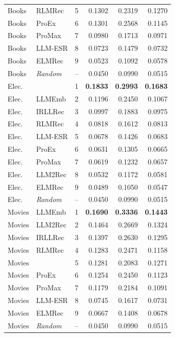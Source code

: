 \begin{table}[t]
\begin{minipage}[t]{0.49\textwidth}
\begin{tabular}{llrrrr}
Books & RLMRec & 5 & 0.1302 & 0.2319 & 0.1270 \\
Books & ProEx & 6 & 0.1301 & 0.2568 & 0.1145 \\
Books & ProMax & 7 & 0.0980 & 0.1713 & 0.0971 \\
Books & LLM-ESR & 8 & 0.0723 & 0.1479 & 0.0732 \\
Books & ELMRec & 9 & 0.0523 & 0.1092 & 0.0578 \\
Books & \textit{Random} & -- & 0.0450 & 0.0990 & 0.0515 \\
\midrule
Elec. & \method{} & 1 & \textbf{0.1833} & \textbf{0.2993} & \textbf{0.1683} \\
Elec. & LLMEmb & 2 & 0.1196 & 0.2450 & 0.1067 \\
Elec. & IRLLRec & 3 & 0.0997 & 0.1883 & 0.0975 \\
Elec. & RLMRec & 4 & 0.0818 & 0.1612 & 0.0813 \\
Elec. & LLM-ESR & 5 & 0.0678 & 0.1426 & 0.0683 \\
Elec. & ProEx & 6 & 0.0631 & 0.1305 & 0.0665 \\
Elec. & ProMax & 7 & 0.0619 & 0.1232 & 0.0657 \\
Elec. & LLM2Rec & 8 & 0.0532 & 0.1172 & 0.0581 \\
Elec. & ELMRec & 9 & 0.0489 & 0.1050 & 0.0547 \\
Elec. & \textit{Random} & -- & 0.0450 & 0.0990 & 0.0515 \\
\midrule
Movies & LLMEmb & 1 & \textbf{0.1690} & \textbf{0.3336} & \textbf{0.1443} \\
Movies & LLM2Rec & 2 & 0.1464 & 0.2669 & 0.1324 \\
Movies & IRLLRec & 3 & 0.1397 & 0.2630 & 0.1295 \\
Movies & RLMRec & 4 & 0.1283 & 0.2471 & 0.1158 \\
Movies & \method{} & 5 & 0.1281 & 0.2083 & 0.1271 \\
Movies & ProEx & 6 & 0.1254 & 0.2450 & 0.1123 \\
Movies & ProMax & 7 & 0.1179 & 0.2184 & 0.1091 \\
Movies & LLM-ESR & 8 & 0.0745 & 0.1617 & 0.0731 \\
Movies & ELMRec & 9 & 0.0667 & 0.1408 & 0.0678 \\
Movies & \textit{Random} & -- & 0.0450 & 0.0990 & 0.0515 \\
\bottomrule
\end{tabular}
\end{minipage}
\hfill
\begin{minipage}[t]{0.49\textwidth}

\end{minipage}
\end{table}
